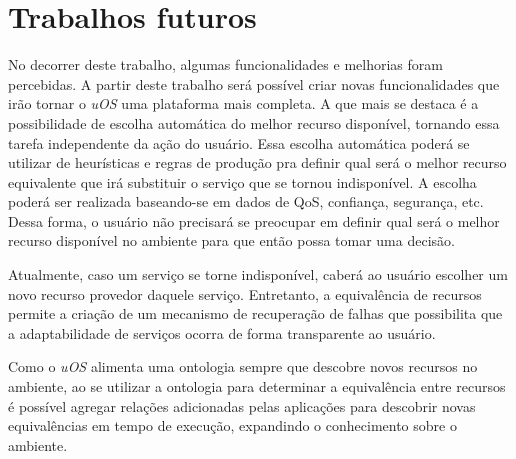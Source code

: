 \section{Trabalhos futuros}
\label{sec:trabalhosFuturos}

No decorrer deste trabalho, algumas funcionalidades e melhorias foram percebidas. A partir deste trabalho será possível criar novas funcionalidades que irão tornar o \emph{uOS} uma plataforma mais completa. A que mais se destaca é a possibilidade de escolha automática do melhor recurso disponível, tornando essa tarefa independente da ação do usuário.  Essa escolha automática poderá se utilizar de heurísticas e regras de produção pra definir qual será o melhor recurso equivalente que irá substituir o serviço que se tornou indisponível. A escolha poderá ser realizada baseando-se em dados 
de QoS, confiança, segurança, etc. Dessa forma, o usuário não precisará se preocupar em definir qual será o melhor recurso disponível no ambiente para que então possa tomar uma decisão.

Atualmente, caso um serviço se torne indisponível, caberá ao usuário escolher um novo recurso provedor daquele serviço.
Entretanto, a equivalência de recursos permite a criação de um mecanismo de recuperação de falhas que possibilita que a adaptabilidade de serviços ocorra de forma transparente ao usuário.

Como o \emph{uOS} alimenta uma ontologia sempre que descobre novos recursos no ambiente, ao se utilizar a ontologia para determinar a equivalência entre recursos é possível agregar relações adicionadas pelas aplicações para descobrir novas equivalências em tempo de execução, expandindo o conhecimento sobre o ambiente.